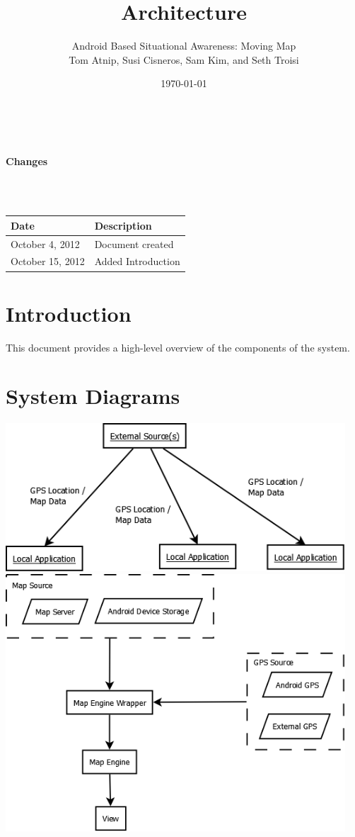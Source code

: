 \documentclass{article}
\begin{document}
\setlength{\voffset}{3.5in}
\title{Architecture}
\author{\Large Android Based Situational Awareness: Moving Map\\
Tom Atnip, Susi Cisneros, Sam Kim, and Seth Troisi}
\date{\today}
\maketitle
\clearpage
\setlength{\voffset}{0pt}
\tableofcontents
\clearpage
~\\
\begin{Large}\textbf{Changes}\end{Large}\\
~\\
\begin{tabular}{ | p{1.5in} | p{4.5in} | }
\hline
\textbf{Date} & \textbf{Description}\\
\hline
\hline
October 4, 2012 & Document created\\
\hline
October 15, 2012 & Added Introduction\\
\hline
\end{tabular}
\clearpage

\section{Introduction}
This document provides a high-level overview of the components of the system.

\section{System Diagrams}
\includegraphics[keepaspectratio, width=5in]{HighLevelSystemView.png} \\
\includegraphics[keepaspectratio, width=5in]{NotDataFlowDiagram.png} \\
\end{document}
